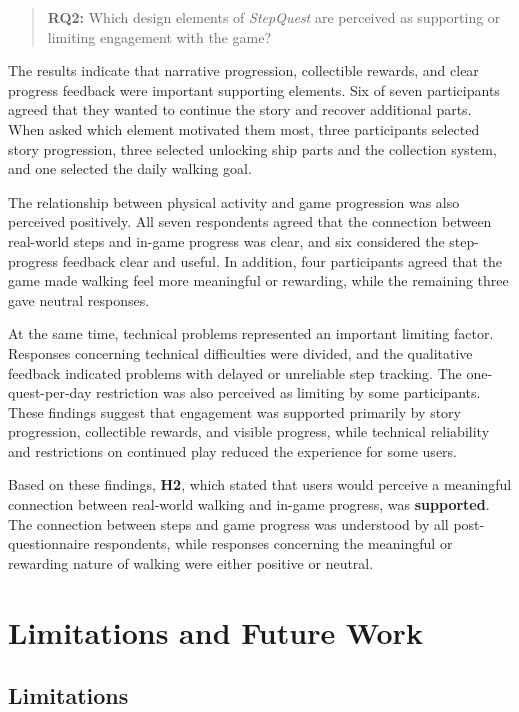 \begin{quote}
	\textbf{RQ2:} Which design elements of \textit{StepQuest} are perceived as
	supporting or limiting engagement with the game?
\end{quote}

The results indicate that narrative progression, collectible rewards, and
clear progress feedback were important supporting elements. Six of seven
participants agreed that they wanted to continue the story and recover
additional parts. When asked which element motivated them most, three
participants selected story progression, three selected unlocking ship
parts and the collection system, and one selected the daily walking goal.

The relationship between physical activity and game progression was also
perceived positively. All seven respondents agreed that the connection
between real-world steps and in-game progress was clear, and six considered
the step-progress feedback clear and useful. In addition, four participants
agreed that the game made walking feel more meaningful or rewarding, while
the remaining three gave neutral responses.

At the same time, technical problems represented an important limiting
factor. Responses concerning technical difficulties were divided, and the
qualitative feedback indicated problems with delayed or unreliable step
tracking. The one-quest-per-day restriction was also perceived as limiting
by some participants. These findings suggest that engagement was supported
primarily by story progression, collectible rewards, and visible progress,
while technical reliability and restrictions on continued play reduced the
experience for some users.

Based on these findings, \textbf{H2}, which stated that users would perceive
a meaningful connection between real-world walking and in-game progress,
was \textbf{supported}. The connection between steps and game progress was
understood by all post-questionnaire respondents, while responses concerning
the meaningful or rewarding nature of walking were either positive or
neutral.


\section{Limitations and Future Work}

\subsection{Limitations}

